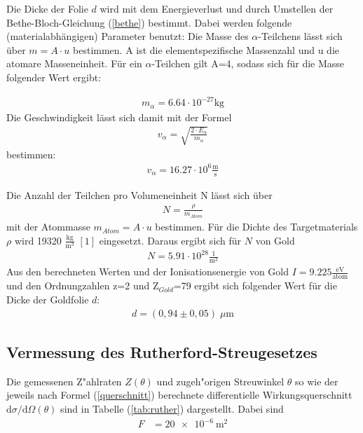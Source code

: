 Die Dicke der Folie $d$ wird mit dem Energieverlust und durch Umstellen der Bethe-Bloch-Gleichung (\ref{bethe}) bestimmt. Dabei werden folgende (materialabhängigen) Parameter benutzt: Die Masse des $\alpha$-Teilchens lässt sich über $m=A \cdot u$ bestimmen. A ist die elementspezifische Massenzahl und u die atomare Masseneinheit. Für ein $\alpha$-Teilchen gilt A=4, sodass sich für die Masse folgender Wert ergibt:

\begin{align*}
m_{\alpha}= 6.64 \cdot 10^{-27} \text{kg}
\end{align*}
Die Geschwindigkeit lässt sich damit mit der Formel
\begin{align*}
v_{\alpha}= \sqrt{\frac{2\cdot E_{\alpha}}{m_{\alpha}}}
\end{align*}
bestimmen:
\begin{align*}
v_{\alpha}=16.27 \cdot 10^{6} \frac{\text{m}}{\text{s}}
\end{align*}

Die Anzahl der Teilchen pro Volumeneinheit N lässt sich über \begin{align}
N= \frac{\rho}{m_{Atom}}
\end{align} mit der Atommasse $m_{Atom}=A \cdot u$ bestimmen.
Für die Dichte des Targetmaterials $\rho$ wird 19320 $\frac{\text{kg}}{\text{m}^3}$ $[1]$ eingesetzt. Daraus ergibt sich für $N$ von Gold
 \begin{align*}
 N=5.91 \cdot 10^{28} \frac{1}{\text{m}^3}
 \end{align*}
 Aus den berechneten Werten und der Ionisationsenergie von Gold $I=9.225 \frac{\text{eV}}{\text{atom}}$ und den Ordnungzahlen z=2 und Z$_{Gold}$=79 ergibt sich folgender Wert für die Dicke der Goldfolie $d$:
 \begin{align*}
 d= ( 0,94 \pm 0,05) \; \mu \text{m}
 \end{align*}

\subsection{Vermessung des Rutherford-Streugesetzes}
  Die gemessenen Z"ahlraten $Z(\theta)$ und zugeh"origen Streuwinkel $\theta$ so wie der jeweils nach Formel (\ref{querschnitt}) berechnete differentielle Wirkungsquerschnitt $\text{d}\sigma/\text{d}\Omega(\theta)$ sind in Tabelle (\ref{tab:ruther}) dargestellt.
  Dabei sind
  \begin{align*}
    F &= \SI{20e-6}{\meter \squared} \\
  \end{align*}


